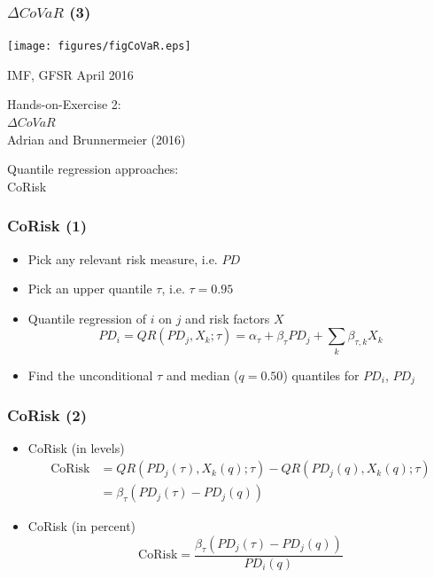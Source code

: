 \documentclass[aspectratio=43,dvipsnames,usenames, svgnames]{beamer}
\begin{document}
\begin{frame} %
\frametitle{$\Delta CoVaR$ (3)}
\begin{center}
	\texttt{[image: figures/figCoVaR.eps]}
\end{center}
\tiny{IMF, GFSR April 2016}
\end{frame}

\begin{frame} %
	\Large{Hands-on-Exercise 2:\\
	$\Delta CoVaR$ }\\
	\vspace{1em}
	\Large{Adrian and Brunnermeier (2016)}
	
\href{https://htmlpreview.github.io/?https://github.com/jchanlauimf/Systemic-Risk/blob/master/CoVaR/CoVaR_Tutorial.html}{}		
\end{frame}

\begin{frame} %
\begin{center} 
	\Large{Quantile regression approaches:\\CoRisk}
\end{center}
\end{frame}

\begin{frame} %
\frametitle{CoRisk (1)}
	\begin{itemize}
		\item Pick any relevant risk measure, i.e. $PD$
		\smallskip
		\item Pick an upper quantile $\tau$, i.e. $\tau = 0.95$
		\smallskip
		\item Quantile regression of $i$ on $j$ and risk factors $X$
		\begin{equation*}
			PD_i = QR(PD_j,X_k; \tau) =  \alpha_{\tau} + \beta_{\tau} PD_j + \sum_k \beta_{\tau,k} X_k
		\end{equation*}
		\item Find the unconditional $\tau$ and median ($q=0.50$) quantiles for $PD_i$, $PD_j$
	\end{itemize}
\end{frame}

\begin{frame} %
\frametitle{CoRisk (2)}
	\begin{itemize}
		\item CoRisk (in levels)
		\begin{equation*}
		\begin{split}
		\text{CoRisk} &= QR(PD_j(\tau), X_k(q); \tau) - QR(PD_j(q), X_k(q); \tau)\\	
		&= \beta_{\tau} \left( PD_j(\tau) - PD_j(q) \right)
		\end{split}	
		\end{equation*}
		\item CoRisk (in percent)
		\begin{equation*}
		\text{CoRisk} = \frac{\beta_{\tau} \left( PD_j(\tau) - PD_j(q) \right)}
			{PD_i(q)}
		\end{equation*}
	\end{itemize}	
\end{frame}
\end{document}
